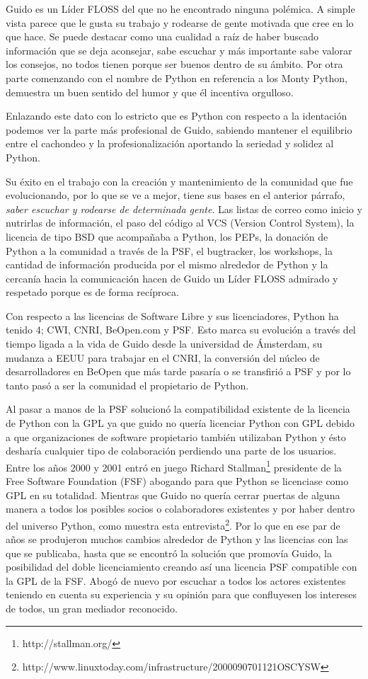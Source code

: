 \documentclass[11pt]{scrartcl}
\begin{document}
Guido es un Líder FLOSS del que no he encontrado ninguna polémica. A simple vista parece que le gusta su trabajo y rodearse de gente motivada que cree en lo que hace. Se puede destacar como una cualidad a raíz de haber buscado información que se deja aconsejar, sabe escuchar y más importante sabe valorar los consejos, no todos tienen porque ser buenos dentro de su ámbito. Por otra parte comenzando con el nombre de Python en referencia a los Monty Python, demuestra un buen sentido del humor y que él incentiva orgulloso.

Enlazando este dato con lo estricto que es Python con respecto a la identación podemos ver la parte más profesional de Guido, sabiendo mantener el equilibrio entre el cachondeo y la profesionalización aportando la seriedad y solidez al Python.

Su éxito en el trabajo con la creación y mantenimiento de la comunidad que fue evolucionando, por lo que se ve a mejor, tiene sus bases en el anterior párrafo, \emph{saber escuchar y rodearse de determinada gente}. Las listas de correo como inicio y nutrirlas de información, el paso del código al VCS (Version Control System), la licencia de tipo BSD que acompañaba a Python, los PEPs, la donación de Python a la comunidad a través de la PSF, el bugtracker, los workshops, la cantidad de información producida por el mismo alrededor de Python y la cercanía hacia la comunicación hacen de Guido un Líder FLOSS admirado y respetado porque es de forma recíproca.

Con respecto a las licencias de Software Libre y sus licenciadores, Python ha tenido 4; CWI, CNRI, BeOpen.com y PSF. Esto marca su evolución a través del tiempo ligada a la vida de Guido desde la universidad de Ámsterdam, su mudanza a EEUU para trabajar en el CNRI, la conversión del núcleo de desarrolladores en BeOpen que más tarde pasaría o se transfirió a PSF y por lo tanto pasó a ser la comunidad el propietario de Python.

Al pasar a manos de la PSF solucionó la compatibilidad existente de la licencia de Python con la GPL ya que guido no quería licenciar Python con GPL debido a que organizaciones de software propietario también utilizaban Python y ésto desharía cualquier tipo de colaboración perdiendo una parte de los usuarios. Entre los años 2000 y 2001 entró en juego Richard Stallman\footnote{http://stallman.org/} presidente de la Free Software Foundation (FSF) abogando para que Python se licenciase como GPL en su totalidad. Mientras que Guido no quería cerrar puertas de alguna manera a todos los posibles socios o colaboradores existentes y por haber dentro del universo Python, como muestra esta entrevista\footnote{http://www.linuxtoday.com/infrastructure/2000090701121OSCYSW}. Por lo que en ese par de años se produjeron muchos cambios alrededor de Python y las licencias con las que se publicaba, hasta que se encontró la solución que promovía Guido, la posibilidad del doble licenciamiento creando así una licencia PSF compatible con la GPL de la FSF. Abogó de nuevo por escuchar a todos los actores existentes teniendo en cuenta su experiencia y su opinión para que confluyesen los intereses de todos, un gran mediador reconocido.
\end{document}
